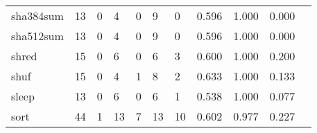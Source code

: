 \begin{longtable}{lp{1.2cm}p{1.2cm}p{1.2cm}p{1.2cm}p{1.2cm}p{1.2cm}p{1.2cm}p{1.2cm}p{1.2cm}p{1.2cm}}
sha384sum &                                    13 &                                                  0 &                                                  4 &                                                  0 &                                                  9 &                                                  0 &                                              0.596 &                                              1.000 &                                              0.000 \\
sha512sum &                                    13 &                                                  0 &                                                  4 &                                                  0 &                                                  9 &                                                  0 &                                              0.596 &                                              1.000 &                                              0.000 \\
shred     &                                    15 &                                                  0 &                                                  6 &                                                  0 &                                                  6 &                                                  3 &                                              0.600 &                                              1.000 &                                              0.200 \\
shuf      &                                    15 &                                                  0 &                                                  4 &                                                  1 &                                                  8 &                                                  2 &                                              0.633 &                                              1.000 &                                              0.133 \\
sleep     &                                    13 &                                                  0 &                                                  6 &                                                  0 &                                                  6 &                                                  1 &                                              0.538 &                                              1.000 &                                              0.077 \\
sort      &                                    44 &                                                  1 &                                                 13 &                                                  7 &                                                 13 &                                                 10 &                                              0.602 &                                              0.977 &                                              0.227 \\

\end{longtable}
